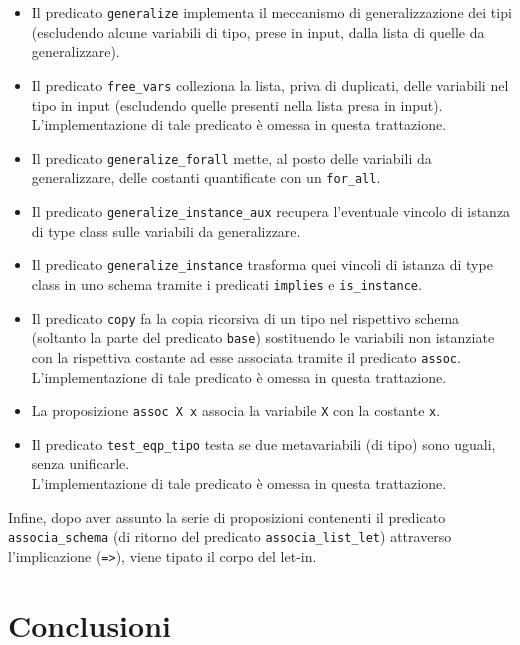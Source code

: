 \documentclass[12pt,a4paper,openright,twoside]{report}
\begin{document}
\begin{itemize}
 \item Il predicato \verb"generalize" implementa il meccanismo di generalizzazione dei tipi (escludendo alcune variabili di tipo, prese in input, dalla lista di quelle da generalizzare).
 \item Il predicato \verb"free_vars" colleziona la lista, priva di duplicati, delle variabili nel tipo in input (escludendo quelle presenti nella lista presa in input).\\
 L'implementazione di tale predicato è omessa in questa trattazione.
 \item Il predicato \verb"generalize_forall" mette, al posto delle variabili da generalizzare, delle costanti quantificate con un \verb"for_all".
 \item Il predicato \verb"generalize_instance_aux" recupera l'eventuale vincolo di istanza di type class sulle variabili da generalizzare.
 \item Il predicato \verb"generalize_instance" trasforma quei vincoli di istanza di type class in uno schema tramite i predicati \verb"implies" e \verb"is_instance".
 \item Il predicato \verb"copy" fa la copia ricorsiva di un tipo nel rispettivo schema (soltanto la parte del predicato \verb"base") sostituendo le variabili non istanziate con la rispettiva costante ad esse associata tramite il predicato \verb"assoc".\\
 L'implementazione di tale predicato è omessa in questa trattazione.
 \item La proposizione \verb"assoc X x" associa la variabile \verb"X" con la costante \verb"x".
 \item Il predicato \verb"test_eqp_tipo" testa se due metavariabili (di tipo) sono uguali, senza unificarle.\\
 L'implementazione di tale predicato è omessa in questa trattazione.
\end{itemize}
Infine, dopo aver assunto la serie di proposizioni contenenti il predicato \verb"associa_schema" (di ritorno del predicato \verb"associa_list_let") attraverso l'implicazione (\verb"=>"), viene tipato il corpo del let-in.

\clearpage{\pagestyle{empty}\cleardoublepage}		%


\chapter{Conclusioni}		%
\end{document}
